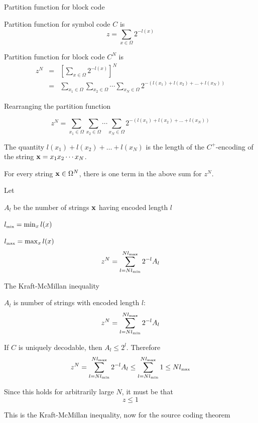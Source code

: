 \documentclass{beamer}
\begin{document}
\begin{frame}{Partition function for block code}

\itemb
\item Partition function for symbol code $C$ is
\[
z = \sum_{x \in {\Omega}} 2^{-l(x)}
\]
\item Partition function for block code $C^N$ is
\begin{eqnarray*}
z^N & = & \left[ \sum_{x \in {\Omega}} 2^{-l(x)} \right]^N \\
& = & \sum_{x_1 \in {\Omega}} \sum_{x_2 \in {\Omega}} \cdots \sum_{x_N \in {\Omega}} 2^{-(l(x_1)+l(x_2)+\ldots+l(x_N))}
\end{eqnarray*}
\iteme

\end{frame}

\begin{frame}{Rearranging the partition function}

\[
z^N = \sum_{x_1 \in {\Omega}} \sum_{x_2 \in {\Omega}} \cdots \sum_{x_N \in {\Omega}} 2^{-(l(x_1)+l(x_2)+\ldots+l(x_N))}
\]

\itemb
\item The quantity $l(x_1)+l(x_2)+\ldots+l(x_N)$ is the length of the $C^+$-encoding of the string ${\bf x} = x_1 x_2 \cdots x_N$.
\item For every string ${\bf x} \in {\Omega}^N$, there is one term in the above sum for $z^N$.
\item Let
 \itemb
 \item $A_l$ be the number of strings ${\bf x}$ having encoded length $l$
 \item $l_{\mbox{\tiny min}} = \min_x l(x)$
 \item $l_{\mbox{\tiny max}} = \max_x l(x)$
 \iteme
\[
z^N = \sum_{l = Nl_{\mbox{\tiny min}}}^{Nl_{\mbox{\tiny max}}} 2^{-l} A_l
\]
\iteme

\end{frame}

\begin{frame}{The Kraft-McMillan inequality}

\itemb
\item $A_l$ is number of strings with encoded length $l$:
\[
z^N = \sum_{l = Nl_{\mbox{\tiny min}}}^{Nl_{\mbox{\tiny max}}} 2^{-l} A_l
\]
\item If $C$ is uniquely decodable, then $A_l \leq 2^l$. Therefore
\[
z^N = \sum_{l = Nl_{\mbox{\tiny min}}}^{Nl_{\mbox{\tiny max}}} 2^{-l} A_l
\leq \sum_{l = Nl_{\mbox{\tiny min}}}^{Nl_{\mbox{\tiny max}}} 1
\leq Nl_{\mbox{\tiny max}}
\]
\item Since this holds for arbitrarily large $N$, it must be that
\[
z \leq 1
\]
\item This is the \alert{Kraft-McMillan inequality}, now for the source coding theorem
\iteme

\end{frame}
\end{document}
